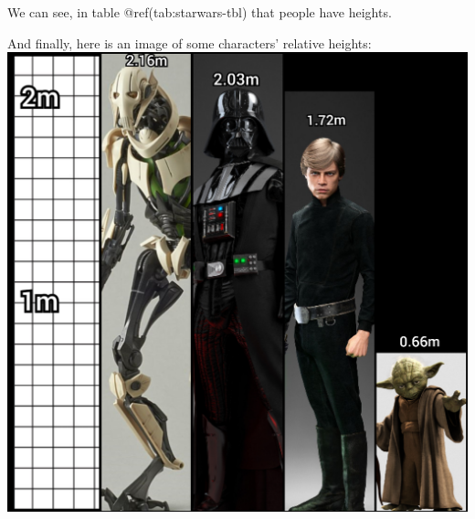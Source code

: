 \documentclass[]{article}
\begin{document}
We can see, in table @ref(tab:starwars-tbl) that people have heights.

And finally, here is an image of some characters' relative heights:\\
\includegraphics{star_wars_heights.png}
\end{document}
